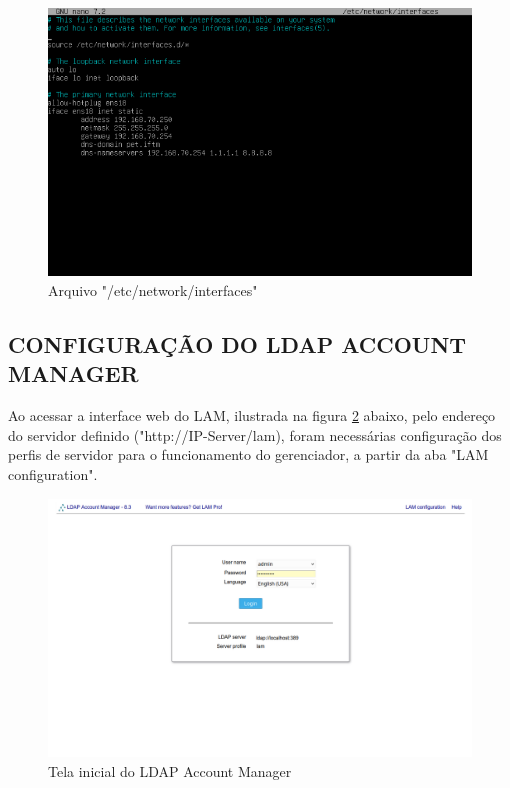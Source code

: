 \begin{figure}[h]
	\centering
	\includegraphics[scale=0.6]{textuais/codigo7.png}
	\caption{Arquivo "/etc/network/interfaces"
	\label{fig:network}}
\end{figure}

\subsection{CONFIGURAÇÃO DO LDAP ACCOUNT MANAGER}

Ao acessar a interface web do LAM, ilustrada na figura \ref{fig:LAM1} abaixo, pelo endereço do servidor definido ("http://IP-Server/lam), foram necessárias configuração dos perfis de servidor para o funcionamento do gerenciador, a partir da aba "LAM configuration".

\begin{figure}[h]
	\centering
	\includegraphics[scale=0.3]{textuais/LAMNovo.png}
	\caption{Tela inicial do LDAP Account Manager
	\label{fig:LAM1}}
\end{figure}

